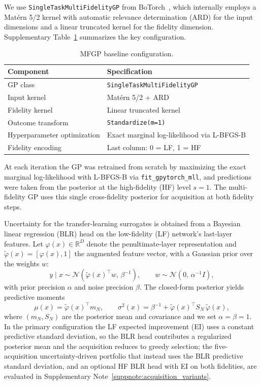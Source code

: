 \documentclass[11pt,a4paper]{article}%
\begin{document}
We use \texttt{SingleTaskMultiFidelityGP} from BoTorch~\citep{balandat2020botorch}, which
internally employs a Mat\'{e}rn 5/2 kernel with automatic relevance determination (ARD)
for the input dimensions and a linear truncated kernel for the fidelity dimension.
Supplementary Table~\ref{supptab:mfgp_config} summarizes the key configuration.

\begin{table}[h]
\centering
\caption{MFGP baseline configuration.}
\label{supptab:mfgp_config}
\begin{tabular}{ll}
\toprule
\textbf{Component} & \textbf{Specification} \\
\midrule
GP class & \texttt{SingleTaskMultiFidelityGP} \\
Input kernel & Mat\'{e}rn 5/2 + ARD \\
Fidelity kernel & Linear truncated kernel \\
Outcome transform & \texttt{Standardize(m=1)} \\
Hyperparameter optimization & Exact marginal log-likelihood via L-BFGS-B \\
Fidelity encoding & Last column: 0 = LF, 1 = HF \\
\bottomrule
\end{tabular}
\end{table}

At each iteration the GP was retrained from scratch by maximizing the exact marginal
log-likelihood with L-BFGS-B via \texttt{fit\_gpytorch\_mll}, and predictions were taken
from the posterior at the high-fidelity (HF) level $s=1$. The multi-fidelity GP uses this
single cross-fidelity posterior for acquisition at both fidelity steps.


Uncertainty for the transfer-learning surrogates is obtained from a Bayesian linear regression (BLR)
head on the low-fidelity (LF) network's last-layer features. Let $\varphi(x) \in \mathbb{R}^D$
denote the penultimate-layer representation and $\tilde{\varphi}(x) = [\varphi(x), 1]$ the
augmented feature vector, with a Gaussian prior over the weights $w$:
\begin{equation}
y \mid x \sim \mathcal{N}\!\left(\tilde{\varphi}(x)^\top w,\, \beta^{-1}\right), \qquad w \sim \mathcal{N}\!\left(0,\, \alpha^{-1} I\right),
\end{equation}
with prior precision $\alpha$ and noise precision $\beta$. The closed-form posterior
yields predictive moments
\begin{equation}
\mu(x) = \tilde{\varphi}(x)^\top m_N, \qquad \sigma^2(x) = \beta^{-1} + \tilde{\varphi}(x)^\top S_N\, \tilde{\varphi}(x),
\end{equation}
where $(m_N, S_N)$ are the posterior mean and covariance and we set $\alpha = \beta = 1$.
In the primary configuration the LF expected improvement (EI) uses a constant predictive standard
deviation, so the BLR head contributes a regularized posterior mean and the acquisition
reduces to greedy selection; the five-acquisition uncertainty-driven portfolio that instead
uses the BLR predictive standard deviation, and an optional HF BLR head with EI
on both fidelities, are evaluated in Supplementary Note~\ref{suppnote:acquisition_variants}.
\end{document}
